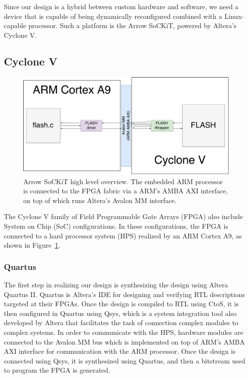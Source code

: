 \documentclass{sig-alternate-10pt}
\begin{document}
Since our design is a hybrid between custom hardware and software, we need a device that is capable of being dynamically reconfigured combined with a Linux-capable processor. Such a platform is the Arrow SoCKiT, powered by Altera's Cyclone V.

\subsection{Cyclone V}
\begin{figure}
	\begin{center}
		\includegraphics[width=0.9\linewidth]{fig/sockit-architecture.png}
		\caption{
			Arrow SoCKiT high level overview. The embedded ARM processor is connected to the FPGA fabric via a ARM's AMBA AXI interface, on top of which runs Altera's Avalon MM interface.
		}
		\label{fig:sockit_overview}
	\end{center}
\end{figure}

The Cyclone V family of Field Programmable Gate Arrays (FPGA) also include
System on Chip (SoC) configurations. In these configurations, the FPGA is
connected to a hard processor system (HPS) realized by an ARM Cortex A9, as
shown in Figure~\ref{fig:sockit_overview}.

\subsubsection{Quartus}
The first step in realizing our design is synthesizing the design using Altera Quartus II. Quartus is Altera's IDE for designing and verifying RTL descriptions targeted at their FPGAs. Once the design is compiled to RTL using CtoS, it is then configured in Quartus using Qsys, which is a system integration tool also developed by Altera that facilitates the task of connection complex modules to complex systems. In order to communicate with the HPS, hardware modules are connected to the Avalon MM bus which is implemented on top of ARM's AMBA AXI interface for communication with the ARM processor. Once the design is connected using Qsys, it is synthesized using Quartus, and then a bitstream used to program the FPGA is generated.
\end{document}
